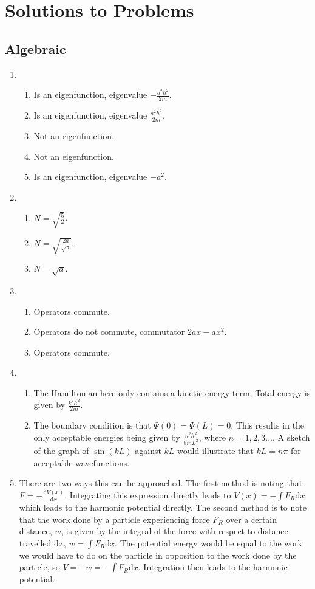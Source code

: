 \documentclass{memoir}[11pt,oneside,a4paper,openany]
\begin{document}
\chapter*{Solutions to Problems}
\section*{Algebraic}
\begin{enumerate}
	\item 
		\begin{enumerate}
			\item Is an eigenfunction, eigenvalue $-\frac{a^2\hbar^2}{2m}$.
			\item Is an eigenfunction, eigenvalue $\frac{a^2\hbar^2}{2m}$.
			\item Not an eigenfunction.
			\item Not an eigenfunction.
			\item Is an eigenfunction, eigenvalue $-a^2$.
		\end{enumerate}
	\item
		\begin{enumerate}
			\item $N = \sqrt{\frac{5}{2}}$.
			\item $N = \sqrt{\frac{2a}{\sqrt{\pi}}}$.
			\item $N = \sqrt{a}$.
		\end{enumerate}
	\item
		\begin{enumerate}
			\item Operators commute.
			\item Operators do not commute, commutator $2ax - ax^2$.
			\item Operators commute.
		\end{enumerate}
	\item
		\begin{enumerate}
			\item The Hamiltonian here only contains a kinetic energy term. Total energy is given by $\frac{k^2\hbar^2}{2m}$.
			\item The boundary condition is that $\Psi(0)=\Psi(L)=0$. This results in the only acceptable energies being given by $\frac{n^2h^2}{8mL^2}$, where $n = 1, 2, 3...$. A sketch of the graph of $\sin(kL)$ against $kL$ would illustrate that $kL = n\pi$ for acceptable wavefunctions.
		\end{enumerate}
	\item There are two ways this can be approached. The first method is noting that $F = -\frac{\mathrm{d}V(x)}{\mathrm{d}x}$. Integrating this expression directly leads to $V(x) = -\int F_R \mathrm{d}x$ which leads to the harmonic potential directly. The second method is to note that the work done by a particle experiencing force $F_R$ over a certain distance, $w$, is given by the integral of the force with respect to distance travelled $\mathrm{d}x$, $w = \int F_R \mathrm{d}x$. The potential energy would be equal to the work we would have to do on the particle in opposition to the work done by the particle, so $V = -w = -\int F_R \mathrm{d}x$. Integration then leads to the harmonic potential.

\end{enumerate}
\end{document}
